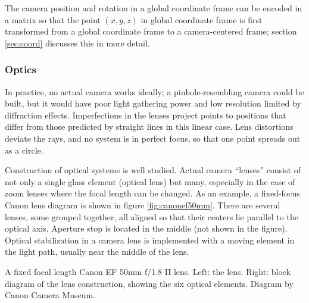 The camera position and rotation in a global coordinate frame can be encoded in a matrix so that the point $(x,y,z)$ in global coordinate frame is first transformed from a global coordinate frame to a camera-centered frame; section \ref{sec:coord} discusses this in more detail.


\subsubsection{Optics} %


In practice, no actual camera works ideally; a pinhole-resembling camera could be built, but it would have poor light gathering power and low resolution limited by diffraction effects. \cite{todo}
Imperfections in the lenses project points to positions that differ from those predicted by straight lines in this linear case.
Lens distortions deviate the rays, and no system is in perfect focus, so that one point spreads out as a circle.

Construction of optical systems is well studied. \cite{kingslake1989history,greenleaf1950photographic}
Actual camera ``lenses'' consist of not only a single glass element (optical lens) but many, especially in the case of zoom lenses where the focal length can be changed.
As an example, a fixed-focus Canon lens diagram is shown in figure \ref{fig:canonef50mm}.
There are several lenses, some grouped together, all aligned so that their centers lie parallel to the optical axis.
Aperture stop is located in the middle (not shown in the figure).
Optical stabilization in a camera lens is implemented with a moving element in the light path, usually near the middle of the lens.


{A fixed focal length Canon EF 50mm f/1.8 II lens. Left: the lens. Right: block diagram of the lens construction, showing the six optical elements. Diagram by Canon Camera Museum.}


